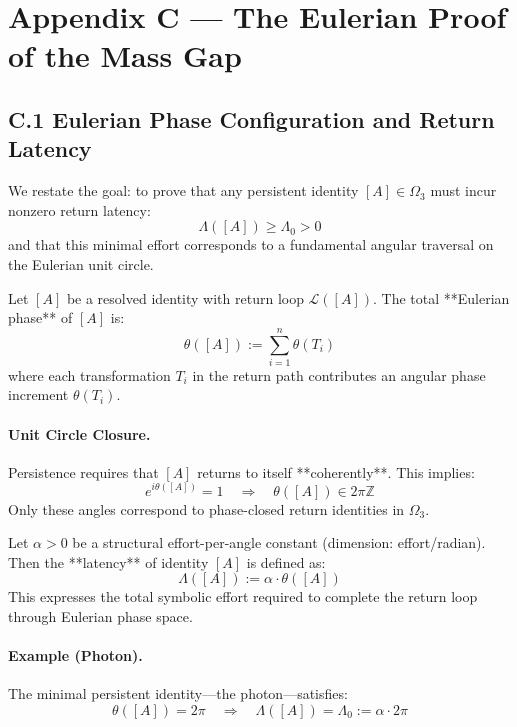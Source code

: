 \appendix
\section*{Appendix C — The Eulerian Proof of the Mass Gap}

\subsection*{C.1 \quad Eulerian Phase Configuration and Return Latency}
\label{sec:c1-phase-latency}

We restate the goal: to prove that any persistent identity $[A] \in \Omega_3$ must incur nonzero return latency:
\[
\Lambda([A]) \geq \Lambda_0 > 0
\]
and that this minimal effort corresponds to a fundamental angular traversal on the Eulerian unit circle.

\begin{definition}
Let $[A]$ be a resolved identity with return loop $\mathcal{L}([A])$. The total **Eulerian phase** of $[A]$ is:
\[
\theta([A]) := \sum_{i=1}^n \theta(T_i)
\]
where each transformation $T_i$ in the return path contributes an angular phase increment $\theta(T_i)$.
\end{definition}

\paragraph{Unit Circle Closure.}
Persistence requires that $[A]$ returns to itself **coherently**. This implies:
\[
e^{i \theta([A])} = 1
\quad \Rightarrow \quad
\theta([A]) \in 2\pi \mathbb{Z}
\]
Only these angles correspond to phase-closed return identities in $\Omega_3$.

\begin{definition}
Let $\alpha > 0$ be a structural effort-per-angle constant (dimension: effort/radian). Then the **latency** of identity $[A]$ is defined as:
\[
\Lambda([A]) := \alpha \cdot \theta([A])
\]
This expresses the total symbolic effort required to complete the return loop through Eulerian phase space.
\end{definition}

\paragraph{Example (Photon).}
The minimal persistent identity—the photon—satisfies:
\[
\theta([A]) = 2\pi \quad \Rightarrow \quad \Lambda([A]) = \Lambda_0 := \alpha \cdot 2\pi
\]


